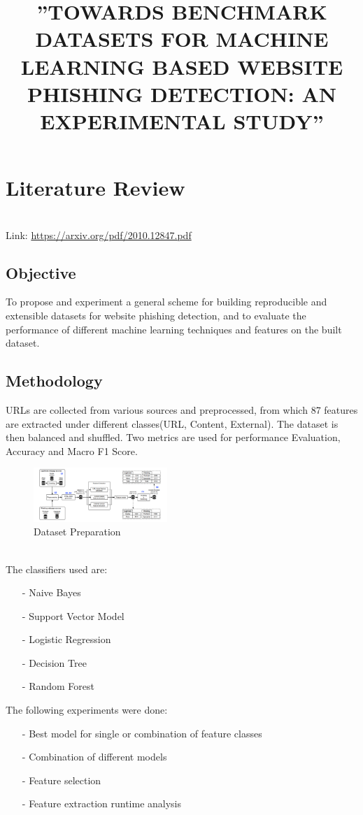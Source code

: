 \section{Literature Review}
\title{”TOWARDS BENCHMARK DATASETS FOR MACHINE LEARNING BASED WEBSITE PHISHING DETECTION: AN EXPERIMENTAL STUDY”}\\
Link: {\small \url{https://arxiv.org/pdf/2010.12847.pdf}}
\subsection{Objective}
To propose and experiment a general scheme for building reproducible and extensible datasets for website phishing detection, and to evaluate the performance of different machine learning techniques and features on the built dataset.
\subsection{Methodology}
URLs are collected from various sources and preprocessed, from which 87 features are extracted under different classes(URL, Content, External). The dataset is then balanced and shuffled. Two metrics are used for performance Evaluation, Accuracy and Macro F1 Score.\\
\begin{figure}[ht!]
    \centering
    \includegraphics[width = 0.45\textwidth]{./images/data_prep.png}
    \caption{Dataset Preparation}
    \label{fig:1}
\end{figure}\\
The classifiers used are:
\begin{itemize}
    \item[-] Naive Bayes
    \item[-] Support Vector Model
    \item[-] Logistic Regression
    \item[-] Decision Tree
    \item[-] Random Forest
\end{itemize}
The following experiments were done:
\begin{itemize}
    \item[-] Best model for single or combination of feature classes
    \item[-] Combination of different models
    \item[-] Feature selection
    \item[-] Feature extraction runtime analysis
\end{itemize}
